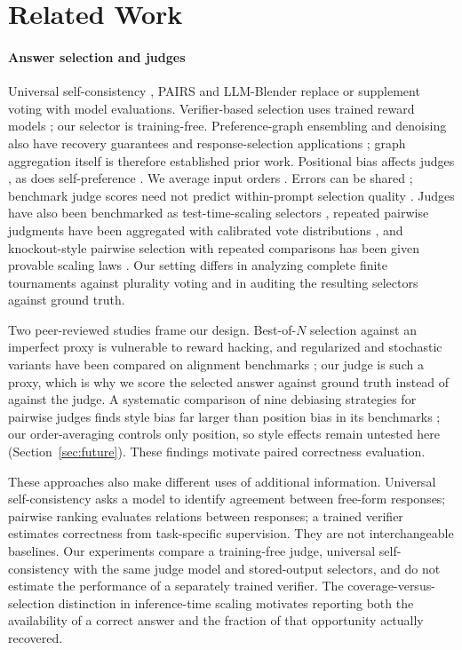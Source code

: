 \documentclass[preprint,11pt,number,sort&compress]{elsarticle}
\begin{document}
\section{Related Work}
\label{sec:related}

\paragraph{Answer selection and judges}
Universal self-consistency \citep{chen2023usc}, PAIRS \citep{liu2024pairs}
and LLM-Blender \citep{jiang2023llmblender} replace or supplement voting
with model evaluations. Verifier-based selection uses trained reward models
\citep{cobbe2021gsm8k,lightman2023letsverify}; our selector is training-free.
Preference-graph ensembling and denoising also have recovery guarantees
and response-selection applications \citep{hu2024pged}; graph aggregation
itself is therefore established prior work.
Positional bias affects judges \citep{zheng2023judging,wang2023notfair},
as does self-preference \citep{panickssery2024selfpref}.
We average input orders \citep{tang2024permutation}. Errors can be shared
\citep{kim2025correlated}; benchmark judge scores need
not predict within-prompt selection quality \citep{landesberg2026bestofn}.
Judges have also been benchmarked as test-time-scaling selectors
\citep{zhou2025jetts}, repeated pairwise judgments have been aggregated
with calibrated vote distributions \citep{dadkhahi2025calibrated}, and
knockout-style pairwise selection with repeated comparisons has been given
provable scaling laws \citep{chen2025provable}. Our setting differs in
analyzing complete finite tournaments against plurality voting and in
auditing the resulting selectors against ground truth.

Two peer-reviewed studies frame our design. Best-of-$N$ selection
against an imperfect proxy is vulnerable to reward hacking, and regularized
and stochastic variants have been compared on alignment benchmarks
\citep{ichihara2025bon}; our judge is such a proxy, which is why we score the
selected answer against ground truth instead of against the judge. A
systematic comparison of nine debiasing strategies for pairwise judges finds
style bias far larger than position bias in its benchmarks
\citep{soumik2026judging}; our order-averaging controls only position, so
style effects remain untested here (Section~\ref{sec:future}).
These findings motivate paired correctness evaluation.

These approaches also make different uses of additional information.
Universal self-consistency asks a model to identify agreement between
free-form responses; pairwise ranking evaluates relations between
responses; a trained verifier estimates correctness from task-specific
supervision. They are not interchangeable baselines. Our experiments
compare a training-free judge, universal self-consistency with the same
judge model and stored-output selectors, and do not
estimate the performance of a separately trained verifier. The
coverage-versus-selection distinction in inference-time scaling
\citep{snell2024scaling} motivates reporting both the
availability of a correct answer and the fraction of that opportunity
actually recovered.
\end{document}
